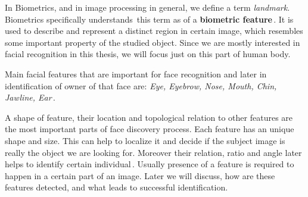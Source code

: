 In Biometrics, and in image processing in general, we define a term \textit{landmark}. Biometrics specifically understands\,\cite{handbook_bio} this term as of a \textbf{biometric feature}\,\cite{nixon2012feature}. It is used to describe and represent a distinct region in certain image, which resembles some important property of the studied object. Since we are mostly interested in facial recognition in this thesis, we will focus just on this part of human body.

Main facial features that are important for face recognition and later in identification of owner of that face are: \textit{Eye, Eyebrow, Nose, Mouth, Chin, Jawline, Ear}\,\cite{biometrie_drahan}.

A shape of feature, their location and topological relation to other features are the most important parts of face discovery process. Each feature has an unique shape and size. This can help to localize it and decide if the subject image is really the object we are looking for. Moreover their relation, ratio and angle later helps to identify certain individual\,\cite{video}. Usually presence of a feature is required to happen in a certain part of an image. Later we will discuss, how are these features detected, and what leads to successful identification.
%
